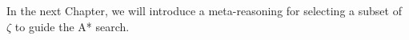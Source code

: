 %
%

In the next Chapter, we will introduce a meta-reasoning for selecting a subset of $\zeta$ to guide the A* search.

\clearpage